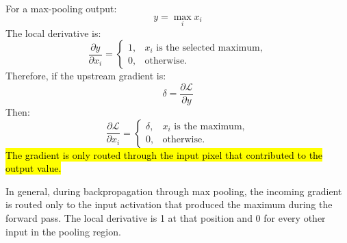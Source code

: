 \highspace
\begin{takeawaysbox}
    For a max-pooling output:
    \begin{equation*}
        y=\max_i x_i
    \end{equation*}
    The local derivative is:
    \begin{equation*}
        \frac{\partial y}{\partial x_i}
        =
        \begin{cases}
            1, & x_i \text{ is the selected maximum},\\
            0, & \text{otherwise}.
        \end{cases}
    \end{equation*}
    Therefore, if the upstream gradient is:
    \begin{equation*}
        \delta=\frac{\partial\mathcal L}{\partial y}
    \end{equation*}
    Then:
    \begin{equation*}
        \frac{\partial\mathcal L}{\partial x_i}
        =
        \begin{cases}
            \delta, & x_i \text{ is the maximum},\\
            0, & \text{otherwise}.
        \end{cases}
    \end{equation*}
    \hl{The gradient is only routed through the input pixel that contributed to the output value.}

    \highspace
    In general, during backpropagation through max pooling, the incoming gradient is routed only to the input activation that produced the maximum during the forward pass. The local derivative is 1 at that position and 0 for every other input in the pooling region.
\end{takeawaysbox}